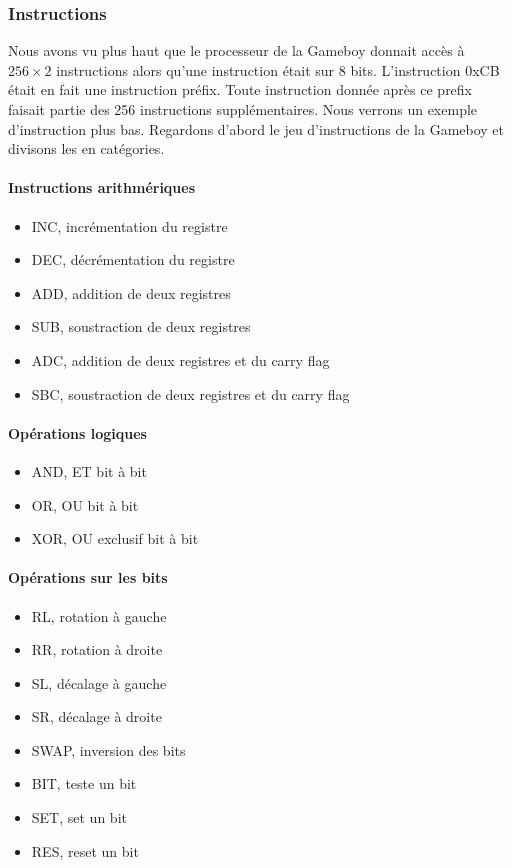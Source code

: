 \documentclass[a4paper]{article}
\begin{document}
\subsubsection{Instructions}
Nous avons vu plus haut que le processeur de la Gameboy donnait accès à $256 \times 2$
instructions alors qu'une instruction était sur 8 bits. L'instruction 0xCB était
en fait une instruction préfix. Toute instruction donnée après ce prefix faisait
partie des 256 instructions supplémentaires. Nous verrons un exemple d'instruction
plus bas. Regardons d'abord le jeu d'instructions de la Gameboy et divisons les en catégories.
\paragraph{Instructions arithmériques}
\begin{itemize}[label=\textbullet]
	\item INC, incrémentation du registre
	\item DEC, décrémentation du registre
	\item ADD, addition de deux registres
	\item SUB, soustraction de deux registres
	\item ADC, addition de deux registres et du carry flag
	\item SBC, soustraction de deux registres et du carry flag
\end{itemize}
\paragraph{Opérations logiques}
\begin{itemize}[label=\textbullet]
	\item AND, ET bit à bit
	\item OR, OU bit à bit
	\item XOR, OU exclusif bit à bit
\end{itemize}
\paragraph{Opérations sur les bits}
\begin{itemize}[label=\textbullet]
	\item RL, rotation à gauche
	\item RR, rotation à droite
	\item SL, décalage à gauche
	\item SR, décalage à droite
	\item SWAP, inversion des bits
	\item BIT, teste un bit
	\item SET, set un bit
	\item RES, reset un bit
\end{itemize}
\end{document}
